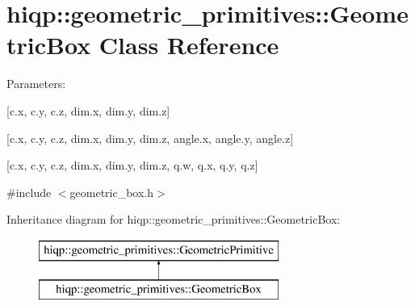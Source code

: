 \hypertarget{classhiqp_1_1geometric__primitives_1_1GeometricBox}{\section{hiqp\-:\-:geometric\-\_\-primitives\-:\-:Geometric\-Box Class Reference}
\label{classhiqp_1_1geometric__primitives_1_1GeometricBox}
}


Parameters\-:\par
 \mbox{[}c.\-x, c.\-y, c.\-z, dim.\-x, dim.\-y, dim.\-z\mbox{]} \par
 \mbox{[}c.\-x, c.\-y, c.\-z, dim.\-x, dim.\-y, dim.\-z, angle.\-x, angle.\-y, angle.\-z\mbox{]} \par
 \mbox{[}c.\-x, c.\-y, c.\-z, dim.\-x, dim.\-y, dim.\-z, q.\-w, q.\-x, q.\-y, q.\-z\mbox{]} \par
  




{\ttfamily \#include $<$geometric\-\_\-box.\-h$>$}

Inheritance diagram for hiqp\-:\-:geometric\-\_\-primitives\-:\-:Geometric\-Box\-:\begin{figure}[H]
\begin{center}
\leavevmode
\includegraphics[height=2.000000cm]{classhiqp_1_1geometric__primitives_1_1GeometricBox}
\end{center}
\end{figure}
